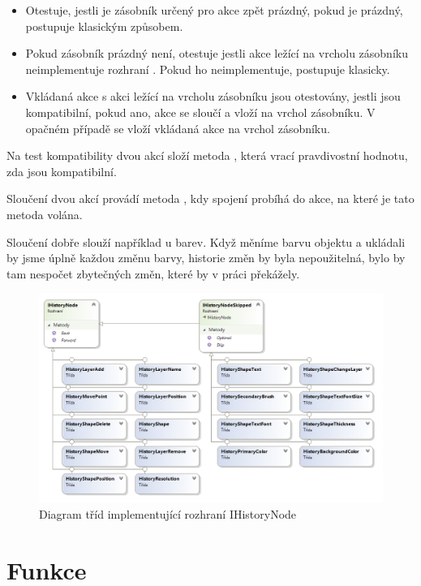 \documentclass[
  field=inf,
  biblatex,
  glossaries,
  index
]{kidiplom}
\begin{document}
\begin{itemize}
\item Otestuje, jestli je zásobník určený pro akce zpět prázdný, pokud je prázdný, postupuje klasickým způsobem.
\item Pokud zásobník prázdný není, otestuje jestli akce ležící na vrcholu zásobníku neimplementuje rozhraní . Pokud ho neimplementuje, postupuje klasicky.
\item Vkládaná akce s akci ležící na vrcholu zásobníku jsou otestovány, jestli jsou kompatibilní, pokud ano, akce se sloučí a vloží na vrchol zásobníku. V opačném případě se vloží vkládaná akce na vrchol zásobníku.
\end{itemize}

Na test kompatibility dvou akcí  složí metoda , která vrací pravdivostní hodnotu, zda jsou kompatibilní.

Sloučení dvou akcí provádí metoda , kdy spojení probíhá do akce, na které je tato metoda volána.

Sloučení dobře slouží například u barev. Když měníme barvu objektu a ukládali by jsme úplně každou změnu barvy, historie změn by byla nepoužitelná, bylo by tam nespočet zbytečných změn, které by v práci překážely.

\begin{figure}
\includegraphics[width=15cm]{img/history_diag}
\caption{Diagram tříd implementující rozhraní IHistoryNode}
\end{figure}  

\section{Funkce}
\end{document}
